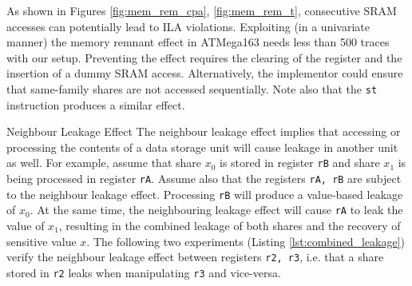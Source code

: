 As shown in Figures \ref{fig:mem_rem_cpa}, \ref{fig:mem_rem_t}, consecutive SRAM accesses can potentially lead to ILA violations. Exploiting (in a univariate manner) the memory remnant effect in ATMega163 needs less than 500 traces with our setup. Preventing the effect requires the clearing of the register and the insertion of a dummy SRAM access. Alternatively, the implementor could ensure that same-family shares are not accessed sequentially. Note also that the \texttt{st} instruction produces a similar effect.
\begin{subsection}{Neighbour Leakage Effect}\label{combined_leakage}
The neighbour leakage effect implies that accessing or processing the contents of a data storage unit will cause leakage in another unit as well. For example, assume that share $x_0$ is stored in register \texttt{rB} and share $x_1$ is being processed in register \texttt{rA}. Assume also that the registers \texttt{rA, rB} are subject to the neighbour leakage effect. Processing \texttt{rB} will produce a value-based leakage of $x_0$. At the same time, the neighbouring leakage effect will cause \texttt{rA} to leak the value of $x_1$, resulting in the combined leakage of both shares and the recovery of sensitive value $x$. The following two experiments (Listing \ref{lst:combined_leakage}) verify the neighbour leakage effect between registers \texttt{r2, r3}, i.e. that a share stored in \texttt{r2} leaks when manipulating \texttt{r3} and vice-versa. 




\end{subsection}
